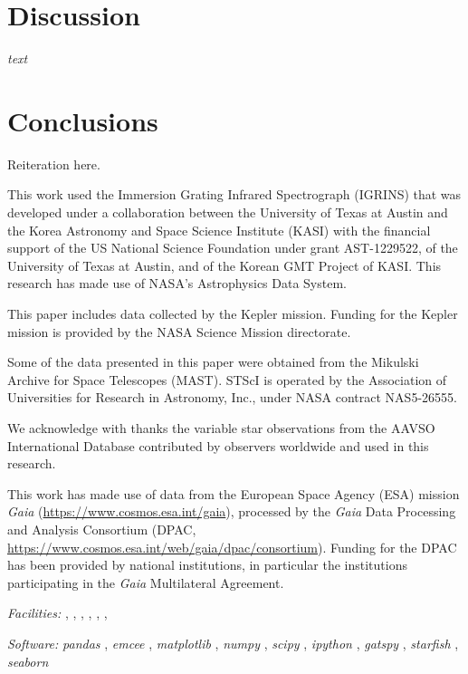 \documentclass[revtex4]{emulateapj}%
\newcommand{\project}[1]{\textsl{#1}}
\begin{document}
\section{Discussion}\label{sec:discussion}

\emph{text}

\section{Conclusions}

Reiteration here.

\clearpage
\pagebreak

\acknowledgements

This work used the Immersion Grating Infrared Spectrograph (IGRINS) that was developed under a collaboration between the University of Texas at Austin and the Korea Astronomy and Space Science Institute (KASI) with the financial support of the US National Science Foundation under grant AST-1229522, of the University of Texas at Austin, and of the Korean GMT Project of KASI.  This research has made use of NASA's Astrophysics Data System.

This paper includes data collected by the Kepler mission. Funding for the Kepler mission is provided by the NASA Science Mission directorate.

Some of the data presented in this paper were obtained from the Mikulski Archive for Space Telescopes (MAST). STScI is operated by the Association of Universities for Research in Astronomy, Inc., under NASA contract NAS5-26555.

We acknowledge with thanks the variable star observations from the AAVSO International Database contributed by observers worldwide and used in this research.

This work has made use of data from the European Space Agency (ESA) mission
{\it Gaia} (\url{https://www.cosmos.esa.int/gaia}), processed by the {\it Gaia}
Data Processing and Analysis Consortium (DPAC,
\url{https://www.cosmos.esa.int/web/gaia/dpac/consortium}). Funding for the DPAC
has been provided by national institutions, in particular the institutions
participating in the {\it Gaia} Multilateral Agreement.


{\it Facilities:} , , , , , , 

{\it Software: }
 \project{pandas} \citep{mckinney10},
 \project{emcee} \citep{foreman13},
 \project{matplotlib} \citep{hunter07},
 \project{numpy} \citep{vanderwalt11},
 \project{scipy} \citep{jones01},
 \project{ipython} \citep{perez07},
 \project{gatspy} \citep{JakeVanderplas2015},
 \project{starfish} \citep{czekala15},
 \project{seaborn} \citep{waskom14}

\clearpage



\end{document}
